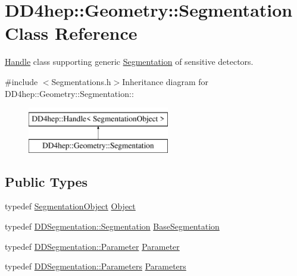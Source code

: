 \hypertarget{class_d_d4hep_1_1_geometry_1_1_segmentation}{
\section{DD4hep::Geometry::Segmentation Class Reference}
\label{class_d_d4hep_1_1_geometry_1_1_segmentation}
}


\hyperlink{class_d_d4hep_1_1_handle}{Handle} class supporting generic \hyperlink{class_d_d4hep_1_1_geometry_1_1_segmentation}{Segmentation} of sensitive detectors.  


{\ttfamily \#include $<$Segmentations.h$>$}Inheritance diagram for DD4hep::Geometry::Segmentation::\begin{figure}[H]
\begin{center}
\leavevmode
\includegraphics[height=2cm]{class_d_d4hep_1_1_geometry_1_1_segmentation}
\end{center}
\end{figure}
\subsection*{Public Types}
\begin{DoxyCompactItemize}
\item 
typedef \hyperlink{class_d_d4hep_1_1_geometry_1_1_segmentation_object}{SegmentationObject} \hyperlink{class_d_d4hep_1_1_geometry_1_1_segmentation_a91154cc3b58985ac86388d00572ee48f}{Object}
\item 
typedef \hyperlink{class_d_d4hep_1_1_d_d_segmentation_1_1_segmentation}{DDSegmentation::Segmentation} \hyperlink{class_d_d4hep_1_1_geometry_1_1_segmentation_a50fcd62c91daf63c26a333d1ee51b192}{BaseSegmentation}
\item 
typedef \hyperlink{class_d_d4hep_1_1_d_d_segmentation_1_1_segmentation_parameter}{DDSegmentation::Parameter} \hyperlink{class_d_d4hep_1_1_geometry_1_1_segmentation_a179c843c1bc64eabb85be55e2538be19}{Parameter}
\item 
typedef \hyperlink{namespace_d_d4hep_1_1_d_d_segmentation_af38026430ca0e1ef64acdfc898f5dd3d}{DDSegmentation::Parameters} \hyperlink{class_d_d4hep_1_1_geometry_1_1_segmentation_af7d9af7b574fa9039f44befc61b7e46f}{Parameters}
\end{DoxyCompactItemize}
